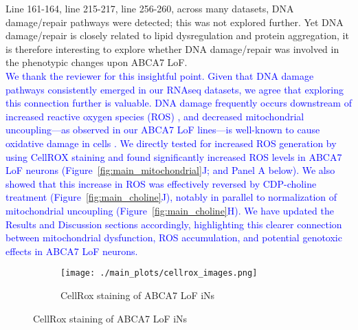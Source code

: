 Line 161-164, line 215-217, line 256-260, across many datasets, DNA damage/repair pathways were detected; this was not explored further. Yet DNA damage/repair is closely related to lipid dysregulation and protein aggregation, it is therefore interesting to explore whether DNA damage/repair was involved in the phenotypic changes upon ABCA7 LoF.\\
\textcolor{blue}{We thank the reviewer for this insightful point. Given that DNA damage pathways consistently emerged in our RNAseq datasets, we agree that exploring this connection further is valuable. DNA damage frequently occurs downstream of increased reactive oxygen species (ROS) \cite{Welch2022-bp}, and decreased mitochondrial uncoupling—as observed in our ABCA7 LoF lines—is well-known to cause oxidative damage in cells \cite{Jain2024-br, Crivelli2024-pf}. We directly tested for increased ROS generation by using CellROX staining and found significantly increased ROS levels in ABCA7 LoF neurons (Figure~\ref{fig:main_mitochondrial}J; and Panel A below). We also showed that this increase in ROS was effectively reversed by CDP-choline treatment (Figure~\ref{fig:main_choline}J), notably in parallel to normalization of mitochondrial uncoupling (Figure~\ref{fig:main_choline}H). We have updated the Results and Discussion sections accordingly, highlighting this clearer connection between mitochondrial dysfunction, ROS accumulation, and potential genotoxic effects in ABCA7 LoF neurons.}

\begin{figure}[H] 
	\centering
	\begin{subfigure}[t]{.7\textwidth}
		\caption{CellRox staining of ABCA7 LoF iNs}
		\texttt{[image: ./main\_plots/cellrox\_images.png]}        
	\end{subfigure}  
\end{figure}